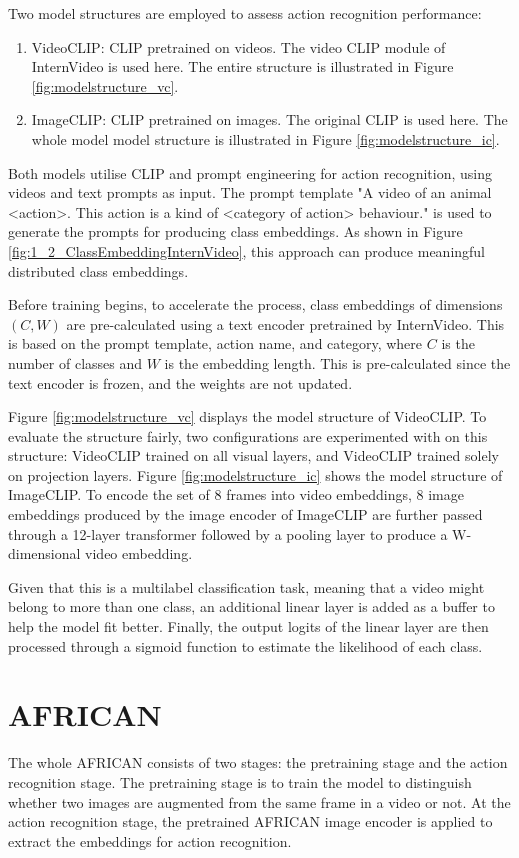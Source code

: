 Two model structures are employed to assess action recognition performance: 
\begin{enumerate}
    \item VideoCLIP: CLIP pretrained on videos. The video CLIP module of InternVideo \parencite{wang2022internvideo} is used here. The entire structure is illustrated in Figure \ref{fig:modelstructure_vc}.
    \item ImageCLIP: CLIP pretrained on images. The original CLIP \parencite{radford2021learning} is used here. The whole model model structure is illustrated in Figure \ref{fig:modelstructure_ic}.
\end{enumerate}

Both models utilise CLIP and prompt engineering for action recognition, using videos and text prompts as input. The prompt template "A video of an animal <action>. This action is a kind of <category of action> behaviour." is used to generate the prompts for producing class embeddings. As shown in Figure \ref{fig:1_2_ClassEmbeddingInternVideo}, this approach can produce meaningful distributed class embeddings.

Before training begins, to accelerate the process, class embeddings of dimensions $(C, W)$ are pre-calculated using a text encoder pretrained by InternVideo. This is based on the prompt template, action name, and category, where $C$ is the number of classes and $W$ is the embedding length. This is pre-calculated since the text encoder is frozen, and the weights are not updated. 

Figure \ref{fig:modelstructure_vc} displays the model structure of VideoCLIP. To evaluate the structure fairly, two configurations are experimented with on this structure: VideoCLIP trained on all visual layers, and VideoCLIP trained solely on projection layers. Figure \ref{fig:modelstructure_ic} shows the model structure of ImageCLIP. To encode the set of 8 frames into video embeddings, 8 image embeddings produced by the image encoder of ImageCLIP are further passed through a 12-layer transformer followed by a pooling layer to produce a W-dimensional video embedding.

Given that this is a multilabel classification task, meaning that a video might belong to more than one class, an additional linear layer is added as a buffer to help the model fit better. Finally, the output logits of the linear layer are then processed through a sigmoid function to estimate the likelihood of each class.

\section{AFRICAN}
The whole AFRICAN consists of two stages: the pretraining stage and the action recognition stage. The pretraining stage is to train the model to distinguish whether two images are augmented from the same frame in a video or not. At the action recognition stage, the pretrained AFRICAN image encoder is applied to extract the embeddings for action recognition. 

